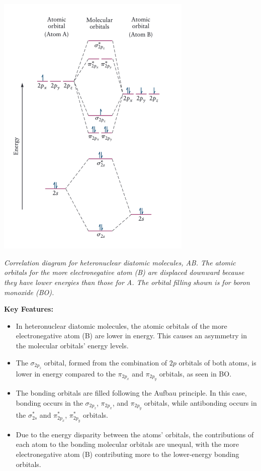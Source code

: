 \documentclass{report}
\begin{document}
\begin{center}
\includegraphics[width=0.7\textwidth]{7.png}
\end{center}
\textit{Correlation diagram for heteronuclear diatomic molecules, AB. The atomic orbitals for the more electronegative atom (B) are displaced downward because they have lower energies than those for A. The orbital filling shown is for boron monoxide (BO).}

\textbf{Key Features:}
\begin{itemize}
    \item In heteronuclear diatomic molecules, the atomic orbitals of the more electronegative atom (B) are lower in energy. This causes an asymmetry in the molecular orbitals' energy levels.
    
    \item The $\sigma_{2p_z}$ orbital, formed from the combination of $2p$ orbitals of both atoms, is lower in energy compared to the $\pi_{2p_x}$ and $\pi_{2p_y}$ orbitals, as seen in BO.

    \item The bonding orbitals are filled following the Aufbau principle. In this case, bonding occurs in the $\sigma_{2p_z}$, $\pi_{2p_x}$, and $\pi_{2p_y}$ orbitals, while antibonding occurs in the $\sigma^*_{2s}$ and $\pi^*_{2p_x}$, $\pi^*_{2p_y}$ orbitals.

    \item Due to the energy disparity between the atoms' orbitals, the contributions of each atom to the bonding molecular orbitals are unequal, with the more electronegative atom (B) contributing more to the lower-energy bonding orbitals.
\end{itemize}
\end{document}
